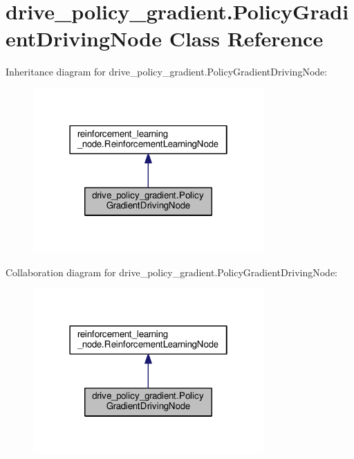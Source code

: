 \hypertarget{classdrive__policy__gradient_1_1_policy_gradient_driving_node}{}\section{drive\+\_\+policy\+\_\+gradient.\+Policy\+Gradient\+Driving\+Node Class Reference}
\label{classdrive__policy__gradient_1_1_policy_gradient_driving_node}


Inheritance diagram for drive\+\_\+policy\+\_\+gradient.\+Policy\+Gradient\+Driving\+Node\+:
\nopagebreak
\begin{figure}[H]
\begin{center}
\leavevmode
\includegraphics[width=250pt]{classdrive__policy__gradient_1_1_policy_gradient_driving_node__inherit__graph}
\end{center}
\end{figure}


Collaboration diagram for drive\+\_\+policy\+\_\+gradient.\+Policy\+Gradient\+Driving\+Node\+:
\nopagebreak
\begin{figure}[H]
\begin{center}
\leavevmode
\includegraphics[width=250pt]{classdrive__policy__gradient_1_1_policy_gradient_driving_node__coll__graph}
\end{center}
\end{figure}
